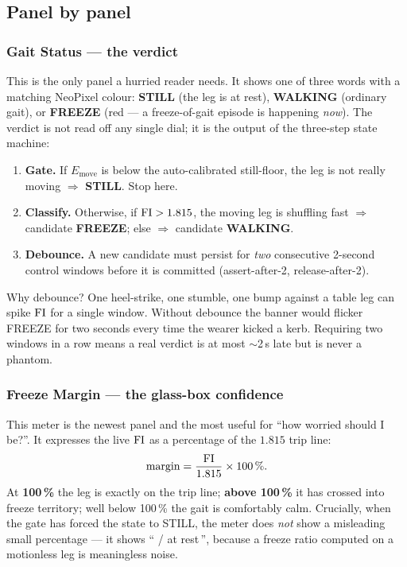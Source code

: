 \subsection{Panel by panel}

\subsubsection*{Gait Status --- the verdict}

This is the only panel a hurried reader needs. It shows one of three words with a
matching NeoPixel colour: \textbf{STILL} (the leg is at rest), \textbf{WALKING} (ordinary
gait), or \textbf{FREEZE} (red --- a freeze-of-gait episode is happening \emph{now}).
The verdict is not read off any single dial; it is the output of the three-step state
machine:
\begin{enumerate}
\item \textbf{Gate.} If $E_{\text{move}}$ is below the auto-calibrated still-floor, the
  leg is not really moving $\Rightarrow$ \textbf{STILL}. Stop here.
\item \textbf{Classify.} Otherwise, if $\mathrm{FI} > 1.815$, the moving leg is shuffling fast
  $\Rightarrow$ candidate \textbf{FREEZE}; else $\Rightarrow$ candidate \textbf{WALKING}.
\item \textbf{Debounce.} A new candidate must persist for \emph{two} consecutive
  2-second control windows before it is committed (assert-after-2, release-after-2).
\end{enumerate}

\begin{intuition}
Why debounce? One heel-strike, one stumble, one bump against a table leg can spike $\mathrm{FI}$
for a single window. Without debounce the banner would flicker FREEZE for two seconds
every time the wearer kicked a kerb. Requiring two windows in a row means a real
verdict is at most $\sim$2\,s late but is never a phantom.
\end{intuition}

\subsubsection*{Freeze Margin --- the glass-box confidence}

This meter is the newest panel and the most useful for ``how worried should I be?''. It
expresses the live $\mathrm{FI}$ as a percentage of the $1.815$ trip line:
\[
\text{margin} = \frac{\mathrm{FI}}{1.815}\times 100\,\%.
\]
At \textbf{100\,\%} the leg is exactly on the trip line; \textbf{above 100\,\%} it has
crossed into freeze territory; well below 100\,\% the gait is comfortably calm. Crucially,
when the gate has forced the state to STILL, the meter does \emph{not} show a misleading
small percentage --- it shows ``\,\textemdash\,/ at rest\,'', because a freeze ratio computed on a
motionless leg is meaningless noise.

